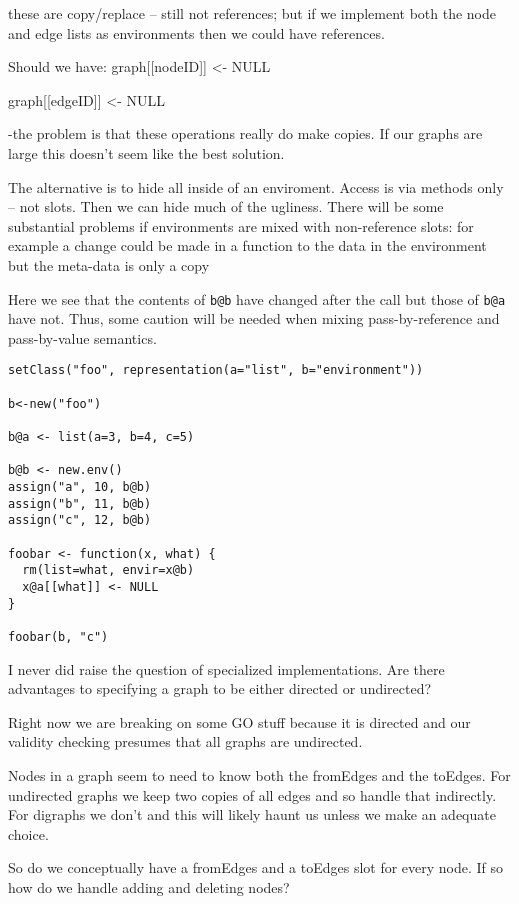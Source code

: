 these are copy/replace -- still not references; but if we implement
both the node and edge lists as environments then we could 
have references.

Should we have:
  graph[[nodeID]] <- NULL

  graph[[edgeID]] <- NULL

-the problem is that these operations really do make copies. If our
 graphs are large this doesn't seem like the best solution.

The alternative is to hide all inside of an enviroment. Access is
via methods only -- not slots. Then we can hide much of the ugliness. 
There will be some substantial problems if environments are mixed with 
non-reference slots: for example a change could be made in a function
to the data in the environment but the meta-data is only a copy

Here we see that the contents of \verb+b@b+ have changed after the
call but those of \verb+b@a+ have not.
Thus, some caution will be needed when mixing pass-by-reference and
pass-by-value semantics.

\begin{verbatim} 
setClass("foo", representation(a="list", b="environment"))

b<-new("foo")

b@a <- list(a=3, b=4, c=5)

b@b <- new.env()
assign("a", 10, b@b)
assign("b", 11, b@b)
assign("c", 12, b@b)

foobar <- function(x, what) {
  rm(list=what, envir=x@b)
  x@a[[what]] <- NULL
}

foobar(b, "c")

\end{verbatim}

I never did raise the question of specialized implementations.
Are there advantages to specifying a graph to be 
either directed or undirected?

Right now we are breaking on some GO stuff because it is directed and
our validity checking presumes that all graphs are undirected.

Nodes in a graph seem to need to know both the fromEdges and the
toEdges.
For undirected graphs we keep two copies of all edges and so handle 
that indirectly. For digraphs we don't and this will likely haunt us
unless we make an adequate choice.

So do we conceptually have a fromEdges and a toEdges slot for every
node.
If so how do we handle adding and deleting nodes?

